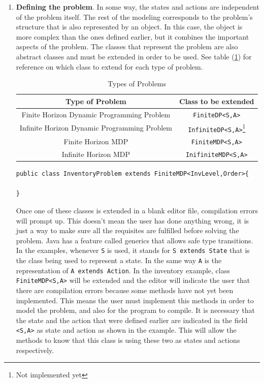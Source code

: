 \documentclass[11pt]{article}
\begin{document}
\begin{enumerate}
\item \textbf{Defining the problem}. In some way, the states and actions are independent of the problem itself. The rest of the modeling corresponds to the problem's structure that is also represented by an object. In this case, the object is more complex than the ones defined earlier, but it combines the important aspects of the problem. The classes that represent the problem are also abstract classes and must be extended in order to be used. See table (\ref{tab:TypesOfProblems}) for reference on which class to extend for each type of problem.

\begin{table}[ht]
  \centering
    \begin{tabular}{|c|c|}
      \hline
      Type of Problem & Class to be extended\\
      \hline
      Finite Horizon Dynamic Programming Problem & \lstinline!FiniteDP<S,A>!\\
      Infinite Horizon Dynamic Programming Problem & \lstinline!InfiniteDP<S,A>!\footnote{Not implemented yet}\\
      Finite Horizon MDP & \lstinline!FiniteMDP<S,A>!\\
      Infinite Horizon MDP & \lstinline!InifiniteMDP<S,A>!\\
      \hline
    \end{tabular}
  \caption{Types of Problems}
  \label{tab:TypesOfProblems}
\end{table}

\lstset{title=,caption=}
\begin{lstlisting}
public class InventoryProblem extends FiniteMDP<InvLevel,Order>{

}
\end{lstlisting}

Once one of these classes is extended in a blank editor file, compilation errors will prompt up. This doesn't mean the user has done anything wrong, it is just a way to make sure all the requisites are fulfilled before solving the problem. Java has a feature called generics that allows safe type transitions. In the examples, whenever \lstinline!S! is used, it stands for \lstinline!S extends State! that is the class being used to represent a state. In the same way \lstinline!A! is the representation of \lstinline!A extends Action!. In the inventory example, class \lstinline!FiniteMDP<S,A>! will be extended and the editor will indicate the user that there are compilation errors because some methods have not yet been implemented. This means the user must implement this methods in order to model the problem, and also for the program to compile. It is necessary that the state and the action that were defined earlier are indicated in the field \lstinline!<S,A>! as state and action as shown in the example. This will allow the methods to know that this class is using these two as states and actions respectively.


\end{enumerate}
\end{document}
